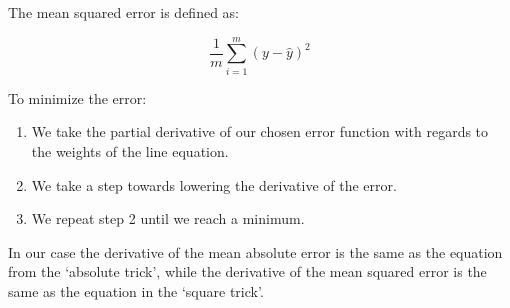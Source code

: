 \documentclass{article}
\begin{document}
The mean squared error is defined as:

\begin{equation}
  \frac{1}{m}\sum_{i = 1}^{m}(y - \hat{y})^2
\end{equation}

To minimize the error:

\begin{enumerate}
  \item We take the partial derivative of our chosen error function with regards to the weights of the line equation.
  \item We take a step towards lowering the derivative of the error.
  \item We repeat step 2 until we reach a minimum.
\end{enumerate}

In our case the derivative of the mean absolute error is the same as the equation from the ‘absolute trick’, while the derivative of the mean squared error is the same as the equation in the ‘square trick’.
\end{document}
